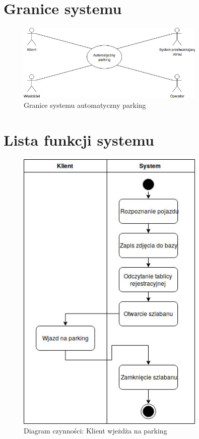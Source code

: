 
\section{Granice systemu}

\begin{figure}[H]
	\centering
	\includegraphics[width=90mm]{diagramy/graniceSystemu.jpg}
	\caption{Granice systemu automatyczny parking \label{overflow}}
\end{figure}

\section{Lista funkcji systemu}

\begin{figure}[H]
	\centering
	\includegraphics[width=90mm]{diagramy/DiagCzynWjazd.jpg}
	\caption{Diagram czynności: Klient wjeżdża na parking \label{overflow}}
\end{figure}

